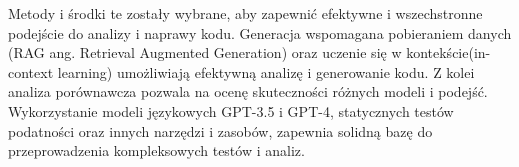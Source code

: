 \newpage
Metody i środki te zostały wybrane, aby zapewnić efektywne i wszechstronne podejście do analizy i naprawy kodu. Generacja wspomagana pobieraniem danych (RAG ang. Retrieval Augmented Generation) oraz uczenie się w kontekście(in-context learning) umożliwiają efektywną analizę i generowanie kodu. 
Z kolei analiza porównawcza pozwala na ocenę skuteczności różnych modeli i podejść. 
Wykorzystanie modeli językowych GPT-3.5 i GPT-4, statycznych testów podatności oraz innych narzędzi i zasobów, zapewnia solidną bazę do przeprowadzenia kompleksowych testów i analiz. 

